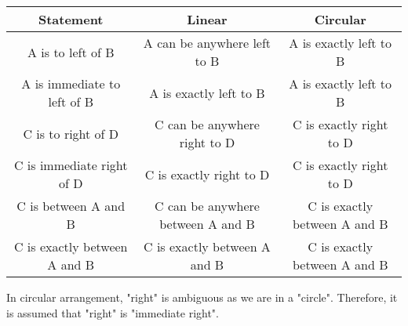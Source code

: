 \begin{table}[h!]
    \centering
    \begin{tabular}{|| c | c | c ||}
        \hline
        Statement & Linear & Circular \\
        \hline
        A is to left of B & A can be anywhere left to B & A is exactly left to B \\
        \hline
        A is immediate to left of B & A is exactly left to B & A is exactly left to B \\
        \hline
        C is to right of D & C can be anywhere right to D & C is exactly right to D \\
        \hline
        C is immediate right of D & C is exactly right to D & C is exactly right to D \\
        \hline 
        C is between A and B & C can be anywhere between A and B & C is exactly between A and B \\
        \hline 
        C is exactly between A and B & C is exactly between A and B & C is exactly between A and B \\
        \hline 
    \end{tabular}
\end{table}

In circular arrangement, "right" is ambiguous as we are in a "circle". Therefore, it is assumed that "right" is "immediate right". 
